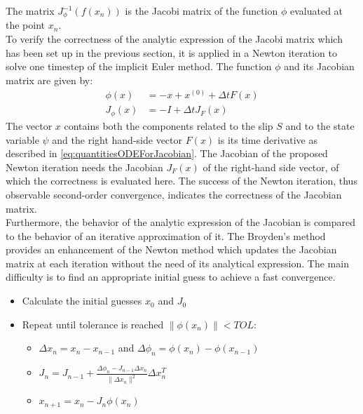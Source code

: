 \documentclass{report}
\begin{document}
The matrix $J_\phi^{-1}(f(x_n))$ is the Jacobi matrix of the function $\phi$ evaluated at the point $x_n$. \\
To verify the correctness of the analytic expression of the Jacobi matrix which has been set up in the previous section, it is applied in a Newton iteration to solve one timestep of the implicit Euler method. The function $\phi$ and its Jacobian matrix are given by: 
\begin{align}
	\phi(x) &= -x + x^{(0)} + \Delta t F(x) \\
	J_\phi(x) &= -I + \Delta t J_F(x)
\end{align}
The vector $x$ contains both the components related to the slip $S$ and to the state variable $\psi$ and the right hand-side vector $F(x)$ is its time derivative as described in \autoref{eq:quantitiesODEForJacobian}. The Jacobian of the proposed Newton iteration needs the Jacobian $J_F(x)$ of the right-hand side vector, of which the correctness is evaluated here. The success of the Newton iteration, thus observable second-order convergence, indicates the correctness of the Jacobian matrix. \\
Furthermore, the behavior of the analytic expression of the Jacobian is compared to the behavior of an iterative approximation of it. The Broyden's method \cite{BroydenIteration} provides an enhancement of the Newton method which updates the Jacobian matrix at each iteration without the need of its analytical expression. The main difficulty is to find an appropriate initial guess to achieve a fast convergence. 

\begin{itemize}
	\item Calculate the initial guesses $x_0$ and $J_0$
	\item Repeat until tolerance is reached $\|\phi(x_n)\| < TOL$: 
	\begin{itemize}
		\item $\Delta x_n = x_n - x_{n-1}$ and $\Delta \phi_n = \phi(x_n) - \phi(x_{n-1})$ 
		\item $J_n = J_{n-1} + \frac{\Delta \phi_n - J_{n-1}\Delta x_n}{\|\Delta x_n\|^2} \Delta x_n^T$
		\item $x_{n+1} = x_n - J_n \phi(x_n)$
	\end{itemize} 
\end{itemize}
\end{document}
